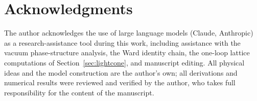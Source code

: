 \documentclass[11pt,a4paper]{article}
\begin{document}
\section*{Acknowledgments}

The author acknowledges the use of large language models
(Claude, Anthropic) as a research-assistance tool during this work,
including assistance with the vacuum phase-structure analysis, the
Ward identity chain, the one-loop lattice computations of
Section~\ref{sec:lightcone}, and manuscript editing.
All physical ideas and the model construction are the author's own;
all derivations and numerical results were reviewed and verified by
the author, who takes full responsibility for the content of the
manuscript.
\end{document}
